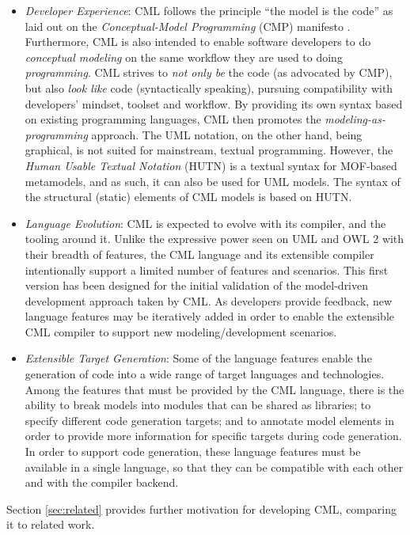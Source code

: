 \begin{itemize}

\item \emph{Developer Experience}:
CML follows the principle ``the model is the code'' as laid out on the \emph{Conceptual-Model Programming} (CMP) manifesto \cite{cmp}.
Furthermore,
CML is also intended to enable software developers to do \emph{conceptual modeling}
on the same workflow they are used to doing \emph{programming}.
CML strives to \emph{not only be} the code (as advocated by CMP),
but also \emph{look like} code (syntactically speaking),
pursuing compatibility with developers' mindset, toolset and workflow.
By providing its own syntax based on existing programming languages,
CML then promotes the \emph{modeling-as-programming} approach.
The UML \cite{uml} notation, on the other hand,
being graphical,
is not suited for mainstream, textual programming.
However, the \emph{Human Usable Textual Notation} (HUTN) \cite{hutn} is a textual syntax for MOF-based \cite{mof} metamodels,
and as such, it can also be used for UML models.
The syntax of the structural (static) elements of CML models is based on HUTN.

\item \emph{Language Evolution}:
CML is expected to evolve with its compiler, and the tooling around it.
Unlike the expressive power seen on UML \cite{uml} and OWL 2 \cite{owl2} with their breadth of features,
the CML language and its extensible compiler intentionally support a limited number of features and scenarios.
This first version has been designed for the initial validation of the model-driven development approach taken by CML.
As developers provide feedback,
new language features may be iteratively added in order to enable the extensible CML compiler to support new modeling/development scenarios.

\item \emph{Extensible Target Generation}:
Some of the language features enable the generation of code into a wide range of target languages and technologies. Among the features that must be provided by the CML language,
there is the ability to break models into modules that can be shared as libraries;
to specify different code generation targets;
and to annotate model elements in order to provide more information for specific targets during code generation.
In order to support code generation, these language features must be available in a single language, so that they can be compatible with each other and with the compiler backend.

\end{itemize}

Section \ref{sec:related} provides further motivation for developing CML,
comparing it to related work.
